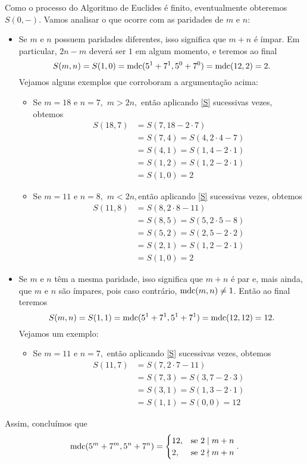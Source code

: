 \documentclass[12pt, a4paper]{article}
\newcommand{\mdc}{{\rm mdc}}
\begin{document}
\begin{solution}
Como o processo do Algoritmo de Euclides é finito, eventualmente obteremos $S(0, -).$ Vamos analisar o que ocorre com as paridades de $m$ e $n:$
\begin{itemize}
    \item Se $m$ e $n$ possuem paridades diferentes, isso significa que $m + n$ é ímpar. Em particular, $2n-m$ deverá ser $1$ em algum momento, e teremos ao final
    \[S(m,n) = S(1,0) = \mdc(5^1 + 7^1, 5^0 + 7^0) = \mdc(12,2) = 2. \]
    Vejamos alguns exemplos que corroboram a argumentação acima:
    
    \begin{itemize}
        \item Se $m = 18$ e $n = 7,$ $m > 2n,$ então aplicando \ref{S} sucessivas vezes, obtemos
        \begin{align*}
            S(18,7) &= S(7, 18-2\cdot 7) \\&= S(7, 4) = S(4, 2\cdot4-7) \\&= S(4,1) = S(1, 4-2\cdot 1) \\&= S(1, 2) = S(1, 2 - 2\cdot1) \\&= S(1,0) = 2 
        \end{align*}

        \item Se $m = 11$ e $n = 8,$ $m < 2n,$então aplicando \ref{S} sucessivas vezes, obtemos
        \begin{align*}
            S(11,8) &= S(8, 2\cdot 8-11) \\&= S(8, 5) = S(5, 2\cdot5 -8) \\&= S(5,2) = S(2, 5-2\cdot 2) \\&= S(2, 1) = S(1,2-2\cdot1) \\&= S(1,0) = 2
        \end{align*}
    \end{itemize}
    \item Se $m$ e $n$ têm a mesma paridade, isso significa que $m + n$ é par e, mais ainda, que $m$ e $n$ são ímpares, pois caso contrário, $\mdc(m,n) \neq 1$. Então ao final teremos 
    \[S(m,n) = S(1,1) = \mdc(5^1 + 7^1, 5^1 + 7^1) = \mdc(12,12) = 12. \]
    Vejamos um exemplo:
    \begin{itemize}
            \item Se $m = 11$ e $n = 7,$ então aplicando \ref{S} sucessivas vezes, obtemos
        \begin{align*}
            S(11,7) &= S(7, 2\cdot 7-11) \\&= S(7, 3) = S(3, 7-2\cdot3) \\&= S(3,1) = S(1, 3-2\cdot 1) \\&= S(1, 1) = S(0,0) = 12
        \end{align*}
        
        \end{itemize}    
\end{itemize}
Assim, concluímos que
\[
\mdc(5^m+7^m,5^n+7^n) = \begin{cases}
12, & \mbox{se } 2 \mid m+n\\
2, & \mbox{se } 2 \nmid m+n
\end{cases}.
\]

\end{solution}
\end{document}
